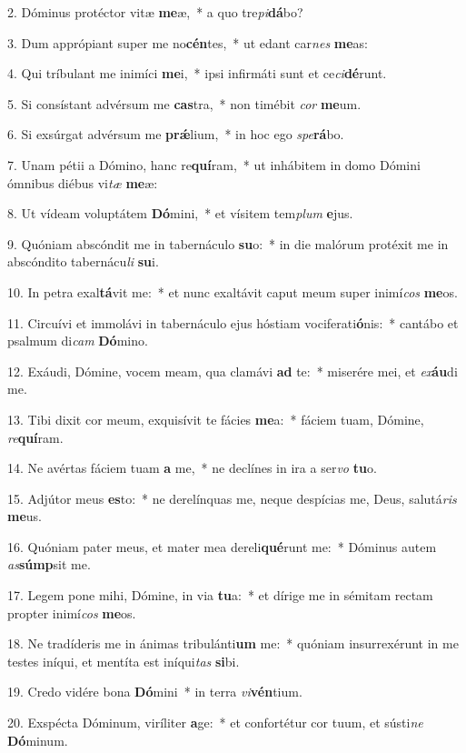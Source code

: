 2. Dóminus protéctor vitæ \textbf{me}æ,~*  a quo tre\textit{pi}\textbf{dá}bo?\

3. Dum apprópiant super me no\textbf{cén}tes,~*  ut edant car\textit{nes} \textbf{me}as:\

4. Qui tríbulant me inimíci \textbf{me}i,~*  ipsi infirmáti sunt et ce\textit{ci}\textbf{dé}runt.\

5. Si consístant advérsum me \textbf{cas}tra,~*  non timébit \textit{cor} \textbf{me}um.\

6. Si exsúrgat advérsum me \textbf{prǽ}lium,~*  in hoc ego \textit{spe}\textbf{rá}bo.\

7. Unam pétii a Dómino, hanc re\textbf{quí}ram,~*  ut inhábitem in domo Dómini ómnibus diébus vi\textit{tæ} \textbf{me}æ:\

8. Ut vídeam voluptátem \textbf{Dó}mini,~*  et vísitem tem\textit{plum} \textbf{e}jus.\

9. Quóniam abscóndit me in tabernáculo \textbf{su}o:~*  in die malórum protéxit me in abscóndito tabernácu\textit{li} \textbf{su}i.\

10. In petra exal\textbf{tá}vit me:~*  et nunc exaltávit caput meum super inimí\textit{cos} \textbf{me}os.\

11. Circuívi et immolávi in tabernáculo ejus hóstiam vociferati\textbf{ó}nis:~*  cantábo et psalmum di\textit{cam} \textbf{Dó}mino.\

12. Exáudi, Dómine, vocem meam, qua clamávi \textbf{ad} te:~*  miserére mei, et \textit{ex}\textbf{áu}di me.\

13. Tibi dixit cor meum, exquisívit te fácies \textbf{me}a:~*  fáciem tuam, Dómine, \textit{re}\textbf{quí}ram.\

14. Ne avértas fáciem tuam \textbf{a} me,~*  ne declínes in ira a ser\textit{vo} \textbf{tu}o.\

15. Adjútor meus \textbf{es}to:~*  ne derelínquas me, neque despícias me, Deus, salutá\textit{ris} \textbf{me}us.\

16. Quóniam pater meus, et mater mea dereli\textbf{qué}runt me:~*  Dóminus autem \textit{as}\textbf{súmp}sit me.\

17. Legem pone mihi, Dómine, in via \textbf{tu}a:~*  et dírige me in sémitam rectam propter inimí\textit{cos} \textbf{me}os.\

18. Ne tradíderis me in ánimas tribulánti\textbf{um} me:~*  quóniam insurrexérunt in me testes iníqui, et mentíta est iníqui\textit{tas} \textbf{si}bi.\

19. Credo vidére bona \textbf{Dó}mini~*  in terra \textit{vi}\textbf{vén}tium.\

20. Exspécta Dóminum, viríliter \textbf{a}ge:~*  et confortétur cor tuum, et sústi\textit{ne} \textbf{Dó}minum.\

